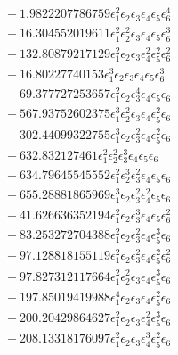 \documentclass[10pt]{article}
\begin{document}
\begin{align*}
&{}  + 1.9822207786759 \epsilon_{1}^{2} \epsilon_{2} \epsilon_{3} \epsilon_{4} \epsilon_{5} \epsilon_{6}^{4} \\
&{}  + 16.304552019611 \epsilon_{1}^{2} \epsilon_{2}^{2} \epsilon_{3} \epsilon_{4} \epsilon_{5} \epsilon_{6}^{3} \\
&{}  + 132.80879217129 \epsilon_{1}^{2} \epsilon_{2} \epsilon_{3} \epsilon_{4}^{2} \epsilon_{5}^{2} \epsilon_{6}^{2} \\
&{}  + 16.80227740153 \epsilon_{1}^{3} \epsilon_{2} \epsilon_{3} \epsilon_{4} \epsilon_{5} \epsilon_{6}^{3} \\
&{}  + 69.377727253657 \epsilon_{1}^{2} \epsilon_{2} \epsilon_{3}^{4} \epsilon_{4} \epsilon_{5} \epsilon_{6} \\
&{}  + 567.93752602375 \epsilon_{1}^{3} \epsilon_{2}^{2} \epsilon_{3} \epsilon_{4} \epsilon_{5}^{2} \epsilon_{6} \\
&{}  + 302.44099322755 \epsilon_{1}^{3} \epsilon_{2} \epsilon_{3}^{2} \epsilon_{4} \epsilon_{5}^{2} \epsilon_{6} \\
&{}  + 632.832127461 \epsilon_{1}^{2} \epsilon_{2}^{2} \epsilon_{3}^{3} \epsilon_{4} \epsilon_{5} \epsilon_{6} \\
&{}  + 634.79645545552 \epsilon_{1}^{2} \epsilon_{2}^{3} \epsilon_{3}^{2} \epsilon_{4} \epsilon_{5} \epsilon_{6} \\
&{}  + 655.28881865969 \epsilon_{1}^{3} \epsilon_{2} \epsilon_{3}^{2} \epsilon_{4}^{2} \epsilon_{5} \epsilon_{6} \\
&{}  + 41.626636352194 \epsilon_{1}^{2} \epsilon_{2} \epsilon_{3}^{3} \epsilon_{4} \epsilon_{5} \epsilon_{6}^{2} \\
&{}  + 83.253272704388 \epsilon_{1}^{2} \epsilon_{2} \epsilon_{3}^{2} \epsilon_{4} \epsilon_{5}^{3} \epsilon_{6} \\
&{}  + 97.128818155119 \epsilon_{1}^{2} \epsilon_{2} \epsilon_{3}^{2} \epsilon_{4} \epsilon_{5}^{2} \epsilon_{6}^{2} \\
&{}  + 97.827312117664 \epsilon_{1}^{2} \epsilon_{2}^{2} \epsilon_{3} \epsilon_{4} \epsilon_{5}^{3} \epsilon_{6} \\
&{}  + 197.85019419988 \epsilon_{1}^{4} \epsilon_{2} \epsilon_{3} \epsilon_{4} \epsilon_{5}^{2} \epsilon_{6} \\
&{}  + 200.20429864627 \epsilon_{1}^{2} \epsilon_{2} \epsilon_{3} \epsilon_{4}^{2} \epsilon_{5}^{3} \epsilon_{6} \\
&{}  + 208.13318176097 \epsilon_{1}^{2} \epsilon_{2} \epsilon_{3} \epsilon_{4}^{3} \epsilon_{5}^{2} \epsilon_{6} \\

\end{align*}
\end{document}
